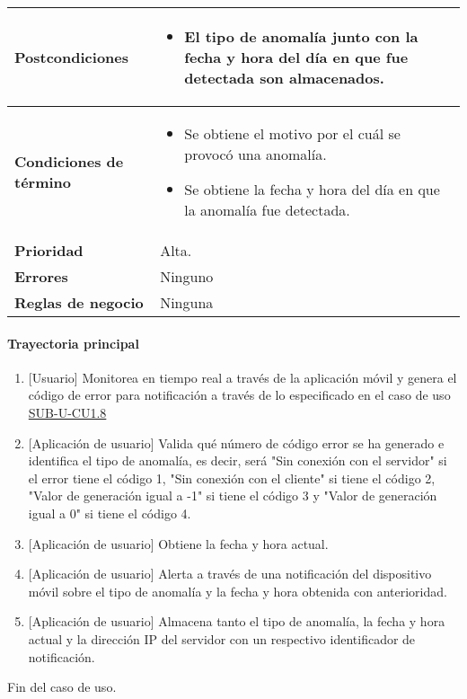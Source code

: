 \begin{longtable}{|J{5cm}|J{10.3cm}|}
	\textbf{Postcondiciones} &
		\begin{itemize}
			\item El tipo de anomalía junto con la fecha y hora del día en que fue detectada son almacenados.
		\end{itemize}\\ \hline
	\textbf{Condiciones de término} & 
		\begin{itemize}
			\item Se obtiene el motivo por el cuál se provocó una anomalía.
			\item Se obtiene la fecha y hora del día en que la anomalía fue detectada.
		\end{itemize} \\ \hline 
	\textbf{Prioridad} & 
		Alta. \\ \hline
	\textbf{Errores} & 
		Ninguno \\ \hline
	\textbf{Reglas de negocio} & 
		Ninguna \\ \hline

\end{longtable}

\paragraph{Trayectoria principal}
	\begin{enumerate}
		\item {[Usuario]} Monitorea en tiempo real a través de la aplicación móvil y genera el código de error para notificación a través de lo especificado en el caso de uso \hyperref[SUB-U-CU1.8]{SUB-U-CU1.8} 
		\item {[Aplicación de usuario]} Valida qué número de código error se ha generado e identifica el tipo de anomalía, es decir, será "Sin conexión con el servidor" si el error tiene el código 1, "Sin conexión con el cliente" si tiene el código 2, "Valor de generación igual a -1" si tiene el código 3 y "Valor de generación igual a 0" si tiene el código 4.
		\item {[Aplicación de usuario]} Obtiene la fecha y hora actual.
		\item {[Aplicación de usuario]} Alerta a través de una notificación del dispositivo móvil sobre el tipo de anomalía y la fecha y hora obtenida con anterioridad.
		\item {[Aplicación de usuario]} Almacena tanto el tipo de anomalía, la fecha y hora actual y la dirección IP del servidor con un respectivo identificador de notificación.
	\end{enumerate}
	Fin del caso de uso.
